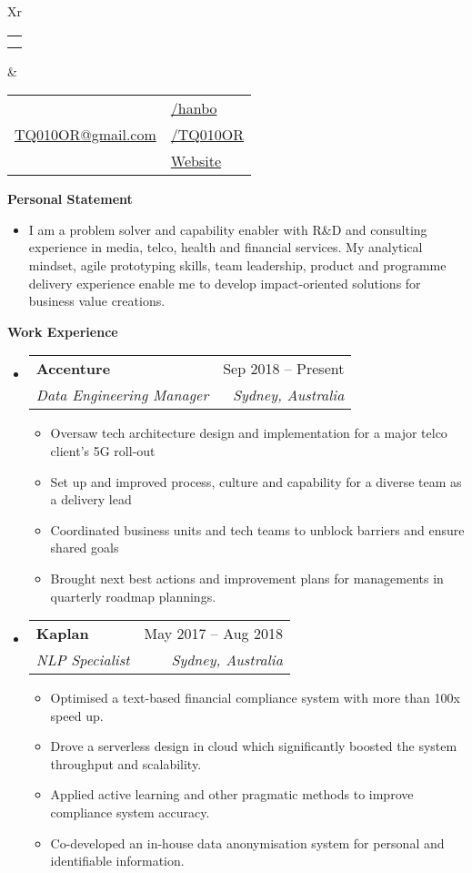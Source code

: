 \documentclass[letterpaper,12pt]{article}[leftmargin=*]
\makeatletter
\def \fullname {Bo HAN}
\def \subtitle {}
\def \linkedinicon {\faLinkedin}
\def \linkedinlink {https://linkedin.com/in/hanbo/}
\def \linkedintext {/hanbo}
\def \phoneicon {\faPhone}
\def \phonetext {+61-425-719-696}
\def \emailicon {\faEnvelope}
\def \emaillink {mailto:tq010or@gmail.com}
\def \emailtext {TQ010OR@gmail.com}
\def \githubicon {\faGithub}
\def \githublink {https://github.com/tq010or}
\def \githubtext {/TQ010OR}
\def \websiteicon {\faGlobe}
\def \websitelink {http://tq010or.github.io/}
\def \websitetext {Website}
\def \headertype {\doublecol} %
\def \entryspacing {-0pt}
\def \linkedin {\linkedinicon \hspace{3pt}\href{\linkedinlink}{\linkedintext}}
\def \phone {\phoneicon \hspace{3pt}{ \phonetext}}
\def \email {\emailicon \hspace{3pt}\href{\emaillink}{\emailtext}}
\def \github {\githubicon \hspace{3pt}\href{\githublink}{\githubtext}}
\def \website {\websiteicon \hspace{3pt}\href{\websitelink}{\websitetext}}
\renewcommand{\section}[2]{\vspace{5pt}
  \colorbox{secondary}{\color{white}\raggedbottom\normalsize\textbf{{#1}{\hspace{7pt}#2}}}
}
\newcommand{\resumeEntryStart}{\begin{itemize}[leftmargin=2.5mm]}
\newcommand{\resumeEntryEnd}{\end{itemize}\vspace{\entryspacing}}
\newcommand{\resumeItemListStart}{\begin{itemize}[leftmargin=4.5mm]}
\newcommand{\resumeItemListEnd}{\end{itemize}}
\newcommand{\resumeItem}[1]{
  \item\small{
    {#1 \vspace{-2pt}}
  }
}
\newcommand{\resumeEntryTSDL}[4]{
  \vspace{-1pt}\item[]
    \begin{tabularx}{0.97\textwidth}{X@{\hspace{60pt}}r}
      \textbf{\color{primary}#1} & {\firabook\color{accent}\small#2} \\
      \textit{\color{accent}\small#3} & \textit{\color{accent}\small#4} \\
    \end{tabularx}\vspace{-6pt}
}
\newcommand{\doublecol}[6]{
  \begin{tabularx}{\textwidth}{Xr}
    {
      \begin{tabular}[c]{l}
        \fontsize{35}{45}\selectfont{\color{primary}{{\textbf{\fullname}}}} \\
        {\textit{\subtitle}} %
      \end{tabular}
    } & {
      \begin{tabular}[c]{l@{\hspace{1.5em}}l}
        {\small#4} & {\small#1} \\
        {\small#5} & {\small#2} \\
        {\small#6} & {\small#3}
      \end{tabular}
    }
  \end{tabularx}
}
\newcommand{\singlecol}[6]{
  \begin{tabularx}{\textwidth}{Xr}
    {
      \begin{tabular}[b]{l}
        \fontsize{35}{45}\selectfont{\color{primary}{{\textbf{\fullname}}}} \\
        {\textit{\subtitle}} %
      \end{tabular}
    } & {
      \begin{tabular}[c]{l}
        {\small#1} \\
        {\small#2} \\
        {\small#3} \\
        {\small#4} \\
        {\small#5} \\
        {\small#6}
      \end{tabular}
    }
  \end{tabularx}
}
\makeatother
\begin{document}


\headertype{\linkedin}{\github}{\website}{\phone}{\email}{} %
\vspace{-10pt} %

\section{\faFlask}{Personal Statement}

    \resumeItemListStart
      \resumeItem {I am a problem solver and capability enabler with R\&D and consulting experience in media, telco, health and financial services. My analytical mindset, agile prototyping skills, team leadership, product and programme delivery experience enable me to develop impact-oriented solutions for business value creations.}
    \resumeItemListEnd

\section{\faPieChart}{Work Experience}

  \resumeEntryStart
    \resumeEntryTSDL
      {Accenture}{Sep 2018 -- Present}
      {Data Engineering Manager}{Sydney, Australia}
    \resumeItemListStart
      \resumeItem {Oversaw tech architecture design and implementation for a major telco client's 5G roll-out}
      \resumeItem {Set up and improved process, culture and capability for a diverse team as a delivery lead}
      \resumeItem {Coordinated business units and tech teams to unblock barriers and ensure shared goals}
      \resumeItem {Brought next best actions and improvement plans for managements in quarterly roadmap plannings.}
    \resumeItemListEnd
  \resumeEntryEnd

  \resumeEntryStart
    \resumeEntryTSDL
      {Kaplan}{May 2017 -- Aug 2018}
      {NLP Specialist}{Sydney, Australia}
    \resumeItemListStart
      \resumeItem {Optimised a text-based financial compliance system with more than 100x speed up.} 
      \resumeItem{Drove a serverless design in cloud which significantly boosted the system throughput and scalability.}
      \resumeItem {Applied active learning and other pragmatic methods to improve compliance system accuracy.}
      \resumeItem {Co-developed an in-house data anonymisation system for personal and identifiable information.}
    \resumeItemListEnd
  \resumeEntryEnd
\end{document}
